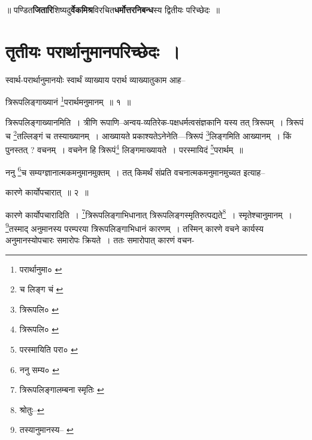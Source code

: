 \documentclass[article,12pt,a4paper]{memoir}
\begin{document}
	  \pstart ॥ पण्डित\textbf{जितारि}शिष्यदु\textbf{र्वेकमिश्र}विरचित\textbf{धर्मोत्तरनिबन्ध}स्य द्वितीयः परिच्छेदः ॥
	\pend
      
	    
	    \endnumbering%
	    \endgroup
	    
	  
	  
	
	    
	    \begingroup
	    \beginnumbering%
	    
	  
\chapter[{तृतीयः परार्थानुमानपरिच्छेदः ।}]{तृतीयः परार्थानुमानपरिच्छेदः ।}
	  \bigskip
	  \begingroup
	

	  \pstart स्वार्थ-परार्थानुमानयोः स्वार्थं व्याख्याय परार्थ व्याख्यातुकाम आह--
	\pend
       
	  \bigskip
	  \begingroup
	

	  \pstart त्रिरूपलिङ्गाख्यानं \footnote{परार्थानुमा० \cite{dp-msB} \cite{dp-edP} \cite{dp-edH} \cite{dp-edE} \cite{dp-edN}}\-परार्थमनुमानम् ॥ १ ॥
	\pend
      
	  \endgroup
	 

	  \pstart त्रिरूपलिङ्गाख्यानमिति । त्रीणि रूपाणि--अन्वय-व्यतिरेक-पक्षधर्मत्वसंज्ञकानि यस्य तत् त्रिरूपम् । त्रिरूपं च \footnote{च लिङ्ग चं \cite{dp-msA}}\-तल्लिङ्गं च तस्याख्यानम् । आख्यायते प्रकाश्यतेऽनेनेति—त्रिरूपं \footnote{त्रिरूपलि० \cite{dp-edE}}\-लिङ्गमिति आख्यानम् । किं पुनस्तत् ? वचनम् । वचनेन हि त्रिरूपं\footnote{त्रिरूपलि० \cite{dp-msC}} लिङ्गमाख्यायते । परस्मायिदं \footnote{परस्मायिति परा० \cite{dp-edE}}\-परार्थम् ॥
	\pend
       

	  \pstart ननु \footnote{ननु सम्य० \cite{dp-msA}}\-च सम्यग्ज्ञानात्मकमनुमानमुक्तम् । तत् किमर्थं संप्रति वचनात्मकमनुमानमुच्यत इत्याह--
	\pend
       
	  \bigskip
	  \begingroup
	

	  \pstart कारणे कार्योपचारात् ॥ २ ॥
	\pend
      
	  \endgroup
	 

	  \pstart कारणे कार्योपचारादिति । \footnote{त्रिरूपलिङ्गालम्बना स्मृतिः \cite{dp-msC} \cite{dp-msD} \cite{dp-msB}}\-त्रिरूपलिङ्गाभिधानात् त्रिरूपलिङ्गस्मृतिरुत्पद्यते\footnote{श्रोतुः--\cite{dp-msD-n}} । स्मृतेश्चानुमानम् । \footnote{तस्यानुमानस्य--\cite{dp-msA} \cite{dp-msB} \cite{dp-edP} \cite{dp-edH} \cite{dp-edE} \cite{dp-edN}}\-तस्माद् अनुमानस्य परम्परया त्रिरूपलिङ्गाभिधानं कारणम् । तस्मिन् कारणे वचने कार्यस्य अनुमानस्योपचारः समारोपः क्रियते । ततः समारोपात् कारणं वचन-
	\pend
      
\end{document}
